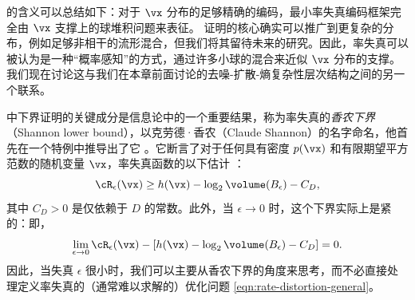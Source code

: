 \documentclass[../../book-main_zh.tex]{subfiles}
\begin{document}
 的含义可以总结如下：对于 $\vx$ 分布的足够精确的编码，最小率失真编码框架完全由 $\vx$ 支撑上的球堆积问题来表征。 证明的核心确实可以推广到更复杂的分布，例如足够非相干的流形混合，但我们将其留待未来的研究。因此，率失真可以被认为是一种“概率感知”的方式，通过许多小球的混合来近似 \(\vx\) 分布的支撑。我们现在讨论这与我们在本章前面讨论的去噪-扩散-熵复杂性层次结构之间的另一个联系。

\begin{remark}\label{rem:slb}
     中下界证明的关键成分是信息论中的一个重要结果，称为率失真的\textit{香农下界}（Shannon lower bound），以克劳德·香农（Claude Shannon）的名字命名，他首先在一个特例中推导出了它 \cite{shannon1959coding}。它断言了对于任何具有密度 $p(\vx)$ 和有限期望平方范数的随机变量 $\vx$，率失真函数的以下估计 \cite{Linder1994-ej}：
    \begin{equation}\label{eq:slb}
        \cR_{\epsilon}(\vx)
        \geq
        h(\vx)
        - \log_2 \volume(B_{\epsilon})
        -
        C_D,
    \end{equation}
    其中 $C_D > 0$ 是仅依赖于 $D$ 的常数。此外，当 $\epsilon \to 0$ 时，这个下界实际上是紧的：即，
    \begin{equation}
        \lim_{\epsilon \to 0} \cR_{\epsilon}(\vx) - \left[ h(\vx) - \log_2
        \volume(B_{\epsilon}) - C_D\right] = 0.
    \end{equation}
    因此，当失真 $\epsilon$ 很小时，我们可以主要从香农下界的角度来思考，而不必直接处理定义率失真的（通常难以求解的）优化问题 \eqref{eqn:rate-distortion-general}。


\end{remark}
\end{document}
